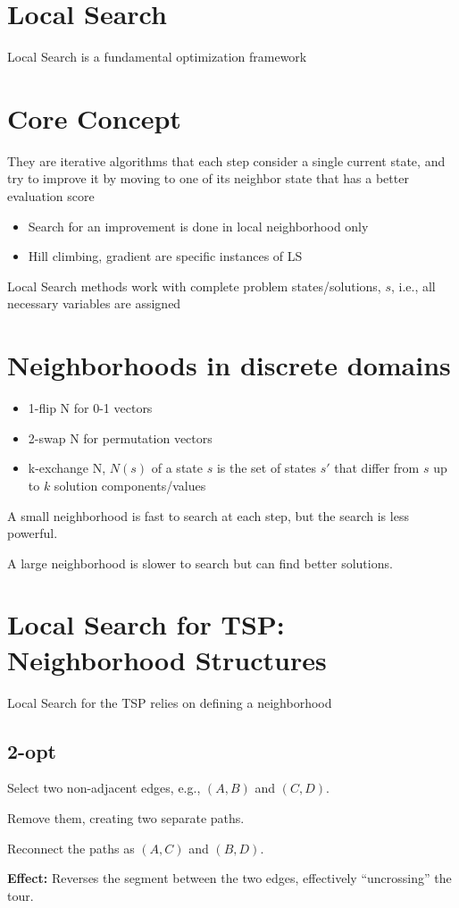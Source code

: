 \section*{Local Search}

Local Search is a fundamental optimization framework
\section*{Core Concept}

They are iterative algorithms that each step consider a single current state, and try to 
improve it by moving to one of its neighbor state that has a better evaluation 
score

\begin{itemize}
    \item Search for an improvement is done in local neighborhood only 
    \item Hill climbing, gradient are specific instances of LS
\end{itemize}

Local Search  methods work with complete problem
states/solutions, $s$, i.e., all necessary variables are assigned

\section*{Neighborhoods in discrete domains}

\begin{itemize}
    \item 1-flip N for 0-1 vectors
    \item 2-swap N for permutation vectors 
    \item k-exchange N, $N(s)$ of a state $s$ is the set of states $s'$ that differ
    from $s$ up to $k$ solution components/values
\end{itemize}

A small neighborhood is fast to search at each step, but the search is less powerful.

A large neighborhood is slower to search but can find better solutions.

\section*{Local Search for TSP: Neighborhood Structures}

Local Search for the TSP relies on defining a neighborhood

\subsection*{2-opt}
\begin{tightitemize}
    \item Select two non-adjacent edges, e.g., $(A,B)$ and $(C,D)$.
    \item Remove them, creating two separate paths.
    \item Reconnect the paths as $(A,C)$ and $(B,D)$.
\end{tightitemize}
\textbf{Effect:} Reverses the segment between the two edges, effectively ``uncrossing'' the tour.  

